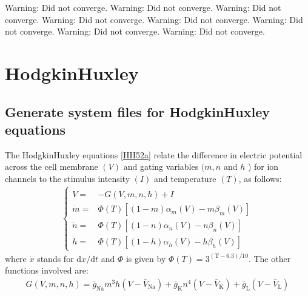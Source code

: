 \documentclass[letterpaper,10pt,english]{jupyterBook}
\begin{document}
\begin{sphinxVerbatim}[commandchars=\\\{\}]
Warning: Did not converge.
Warning: Did not converge.
Warning: Did not converge.
Warning: Did not converge.
Warning: Did not converge.
Warning: Did not converge.
Warning: Did not converge.
Warning: Did not converge.
\end{sphinxVerbatim}

\noindent{}


\part{Hodgkin\sphinxhyphen{}Huxley}


\chapter{Generate system files for Hodgkin\sphinxhyphen{}Huxley equations}
\label{\detokenize{HodgkinHuxleyGenSym:generate-system-files-for-hodgkin-huxley-equations}}\label{\detokenize{HodgkinHuxleyGenSym::doc}}
\sphinxAtStartPar
The Hodgkin\sphinxhyphen{}Huxley equations {[}\hyperlink{cite.references:id18}{HH52a}{]} relate the
difference in electric potential across the cell membrane \((V)\) and gating
variables \((m, n\) and \(h\) ) for ion channels to the stimulus intensity \((I)\)
and temperature \((T)\), as follows:
\begin{equation*}
\begin{split}
\begin{cases}
\dot{V} ={}& -G(V, m, n, h)+I \\
\dot{m} ={}& \Phi(T)\left[(1-m) \alpha_{m}(V)-m \beta_{m}(V)\right] \\
\dot{n} ={}& \Phi(T)\left[(1-n) \alpha_{n}(V)-n \beta_{n}(V)\right] \\
\dot{h} ={}& \Phi(T)\left[(1-h) \alpha_{h}(V)-h \beta_{h}(V)\right]
\end{cases}
\end{split}
\end{equation*}
\sphinxAtStartPar
where \(\dot{x}\) stands for \(\mathrm{d} x / \mathrm{d} t\) and \(\Phi\) is
given by \(\Phi(T)=3^{(\mathrm{T}-6.3) / 10}\). The other functions involved
are:
\begin{equation*}
\begin{split}
G(V, m, n, h)=\bar{g}_{\mathrm{Na}} m^{3}
h\left(V-\bar{V}_{\mathrm{Na}}\right)+\bar{g}_{\mathrm{K}}
n^{4}\left(V-\bar{V}_{\mathrm{K}}\right)+\bar{g}_{\mathrm{L}}\left(V-\bar{V}_{\mathrm{L}}\right)
\end{split}
\end{equation*}
\end{document}
